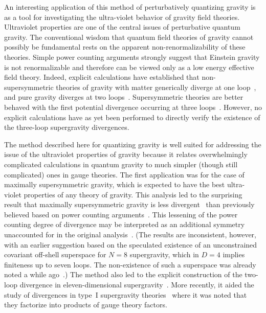An interesting application of this method of perturbatively quantizing
gravity is as a tool for investigating the ultra-violet behavior of
gravity field theories.  Ultraviolet properties are one of the central
issues of perturbative quantum gravity. The conventional wisdom that
quantum field theories of gravity cannot possibly be fundamental
rests on the apparent non-renormalizability of these
theories.  Simple power counting arguments strongly suggest that
Einstein gravity is not renormalizable and therefore can be viewed
only as a low energy effective field theory.  Indeed, explicit
calculations have established that non-supersymmetric theories of
gravity with matter generically diverge at one
loop~\cite{tHooftVeltmanAnnPoin,Deser74,DeserTsao74}, and pure gravity
diverges at two loops~\cite{Goroff86,vandeVen92}.  Supersymmetric
theories are better behaved with the first potential divergence
occurring at three loops~\cite{Deser77,Howe81,Howe89}.  However, no
explicit calculations have as yet been performed to directly
verify the existence of the three-loop supergravity divergences.

The method described here for quantizing gravity is well suited for
addressing the issue of the ultraviolet properties of gravity because
it relates overwhelmingly complicated calculations in quantum gravity
to much simpler (though still complicated) ones in gauge theories.
The first application was for the case of maximally supersymmetric
gravity, which is expected to have the best ultra-violet properties of
any theory of gravity.  This analysis led to the surprising result
that maximally supersymmetric gravity is less divergent~\cite{BDDPR}
than previously believed based on power counting
arguments~\cite{Deser77,Howe81,Howe89}.  This lessening of the power
counting degree of divergence may be interpreted as an additional
symmetry unaccounted for in the original analysis~\cite{Stelle}.  (The
results are inconsistent, however, with an earlier suggestion
\cite{GrisaruSiegel} based on the speculated existence of an
unconstrained covariant off-shell superspace for $N=8$ supergravity,
which in $D=4$ implies finiteness up to seven loops.  The
non-existence of such a superspace was already noted a while
ago~\cite{Howe89}.)  The method also led to the explicit construction
of the two-loop divergence in eleven-dimensional
supergravity~\cite{BDDPR,DeserSeminara99,DeserSeminara00,Bern00Counterterms}.
More recently, it aided the study of divergences in type~I
supergravity theories~\cite{DunbarJulia} where it was noted that they
factorize into products of gauge theory factors.

